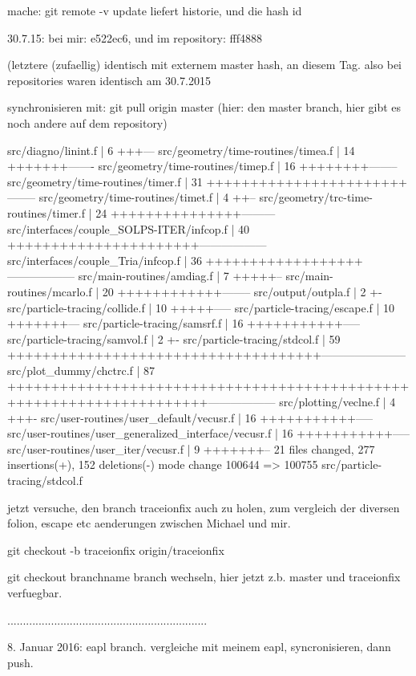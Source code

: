 mache:   git remote -v update    liefert historie, und die hash id

30.7.15:  bei mir: e522ec6,  und im repository: fff4888

(letztere (zufaellig) identisch mit externem master hash, an diesem Tag. also bei 
repositories waren identisch am 30.7.2015 

synchronisieren mit: git pull origin master  (hier: den master branch, hier gibt es noch andere auf dem repository)

 src/diagno/linint.f                                   |  6 +++---
 src/geometry/time-routines/timea.f                    | 14 +++++++-------
 src/geometry/time-routines/timep.f                    | 16 ++++++++--------
 src/geometry/time-routines/timer.f                    | 31 +++++++++++++++++++++++--------
 src/geometry/time-routines/timet.f                    |  4 ++--
 src/geometry/trc-time-routines/timer.f                | 24 +++++++++++++++---------
 src/interfaces/couple_SOLPS-ITER/infcop.f             | 40 ++++++++++++++++++++++------------------
 src/interfaces/couple_Tria/infcop.f                   | 36 ++++++++++++++++++------------------
 src/main-routines/amdiag.f                            |  7 +++++--
 src/main-routines/mcarlo.f                            | 20 ++++++++++++--------
 src/output/outpla.f                                   |  2 +-
 src/particle-tracing/collide.f                        | 10 +++++-----
 src/particle-tracing/escape.f                         | 10 +++++++---
 src/particle-tracing/samsrf.f                         | 16 +++++++++++-----
 src/particle-tracing/samvol.f                         |  2 +-
 src/particle-tracing/stdcol.f                         | 59 ++++++++++++++++++++++++++++++++++++-----------------------
 src/plot_dummy/chctrc.f                               | 87 +++++++++++++++++++++++++++++++++++++++++++++++++++++++++++++++++++++------------------
 src/plotting/veclne.f                                 |  4 +++-
 src/user-routines/user_default/vecusr.f               | 16 +++++++++++-----
 src/user-routines/user_generalized_interface/vecusr.f | 16 +++++++++++-----
 src/user-routines/user_iter/vecusr.f                  |  9 +++++++--
 21 files changed, 277 insertions(+), 152 deletions(-)
 mode change 100644 => 100755 src/particle-tracing/stdcol.f


jetzt versuche, den branch traceionfix auch zu holen, zum vergleich der diversen folion, escape etc aenderungen
zwischen Michael und mir.

git checkout -b traceionfix origin/traceionfix


git checkout branchname  branch wechseln, hier jetzt z.b. master und traceionfix verfuegbar.

................................................................

8. Januar 2016:  eapl branch. vergleiche mit meinem eapl, syncronisieren, dann push.
